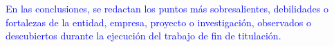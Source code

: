 %
%
\textcolor{blue}{En las conclusiones, se redactan los puntos más sobresalientes, debilidades o fortalezas de la entidad, empresa, proyecto o investigación, observados o descubiertos durante la ejecución del trabajo de fin de titulación.}
	
\Blindtext